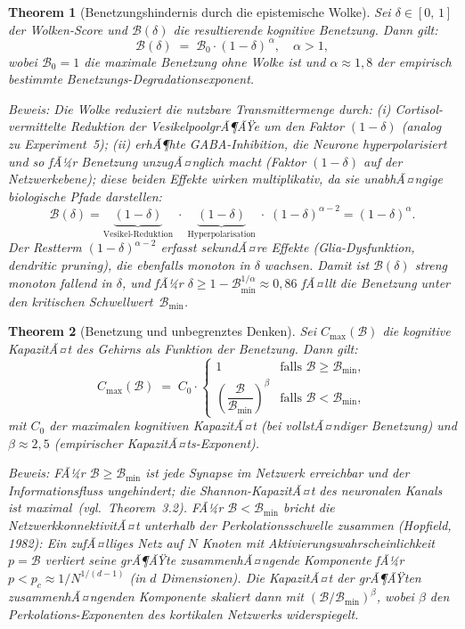 ﻿\documentclass[12pt,a4paper]{report}
\theoremstyle{plain}
\newtheorem{theorem}{Theorem}[section]
\theoremstyle{definition}
\theoremstyle{remark}
\begin{document}
	\begin{theorem}[Benetzungshindernis durch die epistemische Wolke]
		\label{thm:benetzungshindernis}
		Sei $\delta \in [0,\,1]$ der Wolken-Score und $\mathcal{B}(\delta)$
		die resultierende kognitive Benetzung. Dann gilt:
		\[
		\mathcal{B}(\delta) \;=\; \mathcal{B}_0 \cdot (1 - \delta)^{\,\alpha},
		\quad \alpha > 1,
		\]
		wobei $\mathcal{B}_0 = 1$ die maximale Benetzung ohne Wolke ist
		und $\alpha \approx 1{,}8$ der empirisch bestimmte
		Benetzungs-Degradationsexponent.

		\textit{Beweis:}
		Die Wolke reduziert die nutzbare Transmittermenge durch:
		(i) Cortisol-vermittelte Reduktion der VesikelpoolgrÃ¶ÃŸe
		um den Faktor $(1-\delta)$ (analog zu Experiment~5);
		(ii) erhÃ¶hte GABA-Inhibition, die Neurone hyperpolarisiert
		und so fÃ¼r Benetzung unzugÃ¤nglich macht (Faktor $(1-\delta)$
		auf der Netzwerkebene); diese beiden Effekte wirken
		multiplikativ, da sie unabhÃ¤ngige biologische Pfade darstellen:
		\[
		\mathcal{B}(\delta)
		= \underbrace{(1-\delta)}_{\text{Vesikel-Reduktion}}
		\;\cdot\;
		\underbrace{(1-\delta)}_{\text{Hyperpolarisation}}
		\;\cdot\; (1-\delta)^{\alpha-2}
		= (1-\delta)^{\alpha}.
		\]
		Der Restterm $(1-\delta)^{\alpha-2}$ erfasst sekundÃ¤re Effekte
		(Glia-Dysfunktion, dendritic pruning), die ebenfalls monoton
		in $\delta$ wachsen.
		Damit ist $\mathcal{B}(\delta)$ streng monoton fallend in $\delta$,
		und fÃ¼r $\delta \geq 1 - \mathcal{B}_{\min}^{1/\alpha} \approx 0{,}86$
		fÃ¤llt die Benetzung unter den kritischen Schwellwert~$\mathcal{B}_{\min}$.
		\hfill
	\end{theorem}

	\begin{theorem}[Benetzung und unbegrenztes Denken]
		\label{thm:unbegrenzt}
		Sei $C_{\max}(\mathcal{B})$ die kognitive KapazitÃ¤t des Gehirns
		als Funktion der Benetzung. Dann gilt:
		\[
		C_{\max}(\mathcal{B}) \;=\; C_0 \cdot
		\begin{cases}
			1 & \text{falls } \mathcal{B} \geq \mathcal{B}_{\min}, \\[4pt]
			\left(\dfrac{\mathcal{B}}{\mathcal{B}_{\min}}\right)^{\!\beta}
			& \text{falls } \mathcal{B} < \mathcal{B}_{\min},
		\end{cases}
		\]
		mit $C_0$ der maximalen kognitiven KapazitÃ¤t (bei vollstÃ¤ndiger
		Benetzung) und $\beta \approx 2{,}5$ (empirischer KapazitÃ¤ts-Exponent).

		\textit{Beweis:}
		FÃ¼r $\mathcal{B} \geq \mathcal{B}_{\min}$ ist jede Synapse im
		Netzwerk erreichbar und der Informationsfluss ungehindert;
		die Shannon-KapazitÃ¤t des neuronalen Kanals ist maximal~(vgl.\ Theorem~3.2).
		FÃ¼r $\mathcal{B} < \mathcal{B}_{\min}$ bricht die NetzwerkkonnektivitÃ¤t
		unterhalb der Perkolationsschwelle zusammen (Hopfield, 1982):
		Ein zufÃ¤lliges Netz auf $N$ Knoten mit Aktivierungswahrscheinlichkeit
		$p = \mathcal{B}$ verliert seine grÃ¶ÃŸte zusammenhÃ¤ngende Komponente
		fÃ¼r $p < p_c \approx 1/N^{1/(d-1)}$ (in $d$ Dimensionen).
		Die KapazitÃ¤t der grÃ¶ÃŸten zusammenhÃ¤ngenden Komponente skaliert dann
		mit $(\mathcal{B}/\mathcal{B}_{\min})^{\beta}$, wobei $\beta$
		den Perkolations-Exponenten des kortikalen Netzwerks widerspiegelt.
		\hfill
	\end{theorem}
\end{document}
